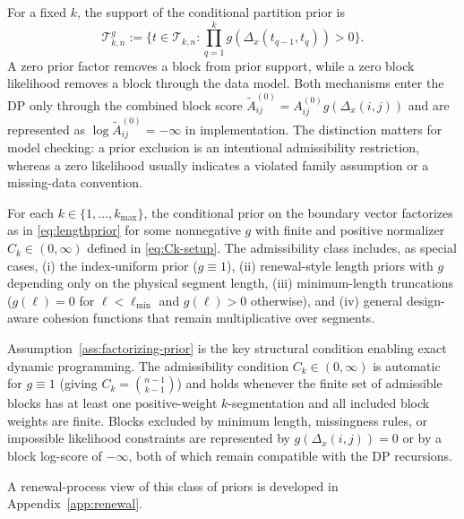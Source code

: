 \begin{definition}
\label{def:admissible-blocks}
For a fixed $k$, the support of the conditional partition prior is
\[
\mathcal{T}^{g}_{k,n}:=\{t\in\mathcal{T}_{k,n}:\prod_{q=1}^k g(\Delta_x(t_{q-1},t_q))>0\}.
\]
A zero prior factor removes a block from prior support, while a zero block likelihood removes a
block through the data model. Both mechanisms enter the DP only through the combined block score
$\widetilde A^{(0)}_{ij}=A^{(0)}_{ij}g(\Delta_x(i,j))$ and are represented as
$\log\widetilde A^{(0)}_{ij}=-\infty$ in implementation. The distinction matters for model
checking: a prior exclusion is an intentional admissibility restriction, whereas a zero likelihood
usually indicates a violated family assumption or a missing-data convention.
\end{definition}

\begin{assumption}
\label{ass:factorizing-prior}
For each $k\in\{1,\dots,k_{\max}\}$, the conditional prior on the boundary vector factorizes as in
\eqref{eq:lengthprior} for some nonnegative $g$ with finite and positive normalizer
$C_k\in(0,\infty)$ defined in \eqref{eq:Ck-setup}. The admissibility class includes, as special
cases, (i) the index-uniform prior ($g\equiv 1$), (ii) renewal-style length priors with $g$
depending only on the physical segment length, (iii) minimum-length truncations
($g(\ell)=0$ for $\ell<\ell_{\min}$ and $g(\ell)>0$ otherwise), and (iv) general design-aware
cohesion functions that remain multiplicative over segments.
\end{assumption}

Assumption~\ref{ass:factorizing-prior} is the key structural condition enabling exact dynamic
programming. The admissibility condition $C_k\in(0,\infty)$ is automatic for $g\equiv 1$ (giving
$C_k=\binom{n-1}{k-1}$) and holds whenever the finite set of admissible blocks has at least one
positive-weight $k$-segmentation and all included block weights are finite. Blocks excluded by
minimum length, missingness rules, or impossible likelihood constraints are represented by
$g(\Delta_x(i,j))=0$ or by a block log-score of $-\infty$, both of which remain compatible with
the DP recursions.

A renewal-process view of this class of priors is developed in Appendix~\ref{app:renewal}.
